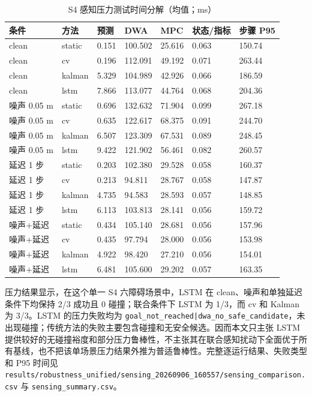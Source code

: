 \documentclass[11pt,a4paper]{ctexart}
\begin{document}
\begin{table}[t]
\centering
\small
\caption{S4 感知压力测试时间分解（均值；ms）}
\label{tab:table-8}
\begin{tabularx}{\linewidth}{YYYYYYY}
\toprule
条件 & 方法 & 预测 & DWA & MPC & 状态/指标 & 步骤 P95 \\
\midrule
clean & static & 0.151 & 100.502 & 25.616 & 0.063 & 150.74 \\
clean & cv & 0.196 & 112.091 & 49.192 & 0.071 & 263.44 \\
clean & kalman & 5.329 & 104.989 & 42.926 & 0.066 & 186.59 \\
clean & lstm & 7.866 & 113.077 & 44.764 & 0.068 & 204.36 \\
噪声 0.05 m & static & 0.696 & 132.632 & 71.904 & 0.099 & 267.18 \\
噪声 0.05 m & cv & 0.635 & 122.617 & 68.375 & 0.091 & 244.70 \\
噪声 0.05 m & kalman & 6.507 & 123.309 & 67.531 & 0.089 & 248.45 \\
噪声 0.05 m & lstm & 9.422 & 121.902 & 56.461 & 0.082 & 260.57 \\
延迟 1 步 & static & 0.203 & 102.380 & 29.528 & 0.058 & 160.37 \\
延迟 1 步 & cv & 0.213 & 94.811 & 28.767 & 0.058 & 147.87 \\
延迟 1 步 & kalman & 4.735 & 94.583 & 28.593 & 0.057 & 148.85 \\
延迟 1 步 & lstm & 6.113 & 103.813 & 28.141 & 0.056 & 159.72 \\
噪声+延迟 & static & 0.434 & 105.140 & 28.681 & 0.056 & 157.96 \\
噪声+延迟 & cv & 0.435 & 97.794 & 28.000 & 0.056 & 153.98 \\
噪声+延迟 & kalman & 4.922 & 98.420 & 27.210 & 0.056 & 154.01 \\
噪声+延迟 & lstm & 6.481 & 105.600 & 29.202 & 0.057 & 163.35 \\
\bottomrule
\end{tabularx}
\end{table}

压力结果显示，在这个单一 S4 六障碍场景中，LSTM 在 clean、噪声和单独延迟条件下均保持 2/3 成功且 0 碰撞；联合条件下 LSTM 为 1/3，而 cv 和 Kalman 为 3/3。LSTM 的压力失败均为 \texttt{goal\_not\_reached|dwa\_no\_safe\_candidate}，未出现碰撞；传统方法的失败主要包含碰撞和无安全候选。因而本文只主张 LSTM 提供较好的无碰撞裕度和部分压力鲁棒性，不主张其在联合感知扰动下全面优于所有基线，也不把该单场景压力结果外推为普适鲁棒性。完整逐运行结果、失败类型和 P95 时间见 \texttt{results/robustness\_unified/sensing\_20260906\_160557/sensing\_comparison.csv} 与 \texttt{sensing\_summary.csv}。
\end{document}
